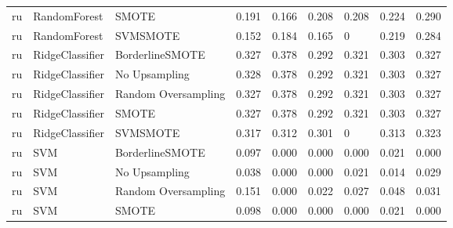\begin{tabular}{lllllllll}
      ru &                 RandomForest &               SMOTE & 0.191 &                     0.166 &                 0.208 &                  0.208 &                                   0.224 &     0.290 \\
      ru &                 RandomForest &            SVMSMOTE & 0.152 &                     0.184 &                 0.165 &                      0 &                                   0.219 &     0.284 \\
      ru &              RidgeClassifier &     BorderlineSMOTE & 0.327 &                     0.378 &                 0.292 &                  0.321 &                                   0.303 &     0.327 \\
      ru &              RidgeClassifier &       No Upsampling & 0.328 &                     0.378 &                 0.292 &                  0.321 &                                   0.303 &     0.327 \\
      ru &              RidgeClassifier & Random Oversampling & 0.327 &                     0.378 &                 0.292 &                  0.321 &                                   0.303 &     0.327 \\
      ru &              RidgeClassifier &               SMOTE & 0.327 &                     0.378 &                 0.292 &                  0.321 &                                   0.303 &     0.327 \\
      ru &              RidgeClassifier &            SVMSMOTE & 0.317 &                     0.312 &                 0.301 &                      0 &                                   0.313 &     0.323 \\
      ru &                          SVM &     BorderlineSMOTE & 0.097 &                     0.000 &                 0.000 &                  0.000 &                                   0.021 &     0.000 \\
      ru &                          SVM &       No Upsampling & 0.038 &                     0.000 &                 0.000 &                  0.021 &                                   0.014 &     0.029 \\
      ru &                          SVM & Random Oversampling & 0.151 &                     0.000 &                 0.022 &                  0.027 &                                   0.048 &     0.031 \\
      ru &                          SVM &               SMOTE & 0.098 &                     0.000 &                 0.000 &                  0.000 &                                   0.021 &     0.000 \\

\end{tabular}
